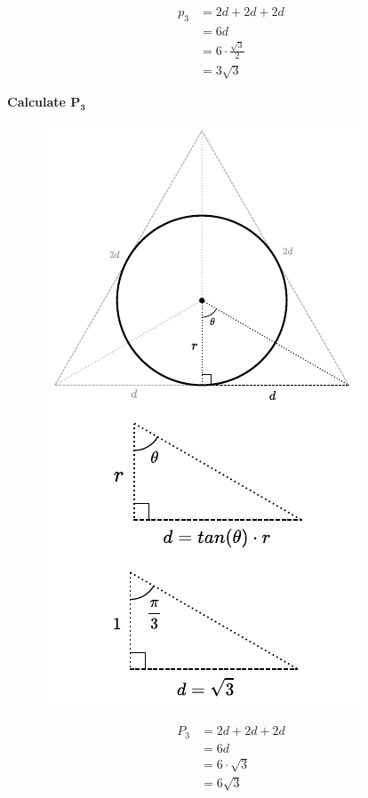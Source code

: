 \documentclass[twocolumn]{article}
\begin{document}
\begin{align*}
	p_{3}&=2d+2d+2d\\ 
	&=6d\\
	&=6\cdot\frac{\sqrt{3}}{2}\\ 
	&=3\sqrt{3}
\end{align*}

\pagebreak

\textbf{Calculate $\mathbf{P_3}$}	
	
\begin{figure}[H]
	\centering
	\includegraphics[width=0.8\linewidth]{../drawings/p1_2}
\end{figure}



\begin{align*}
	P_{3}&=2d+2d+2d\\ 
	&=6d\\
	&=6\cdot\sqrt{3}\\ 
	&=6\sqrt{3}
\end{align*}
\end{document}
